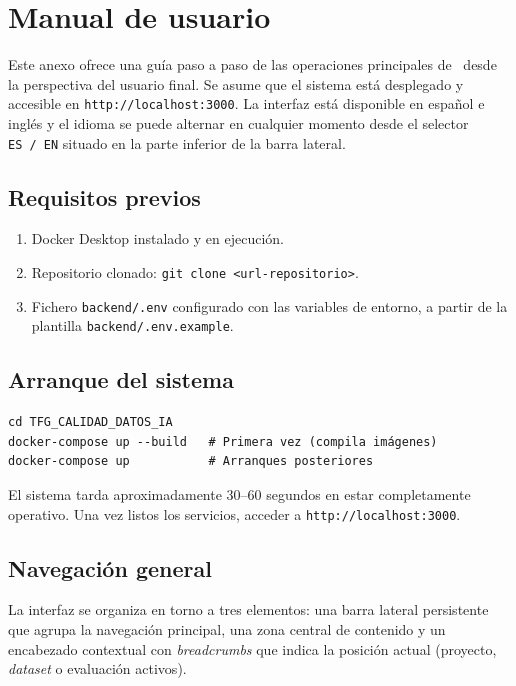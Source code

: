 \chapter{Manual de usuario}
\label{anx:manual}

Este anexo ofrece una guía paso a paso de las operaciones principales
de \dataqual\ desde la perspectiva del usuario final.  Se asume que el
sistema está desplegado y accesible en \texttt{http://localhost:3000}.
La interfaz está disponible en español e inglés y el idioma se puede
alternar en cualquier momento desde el selector \texttt{ES~/~EN}
situado en la parte inferior de la barra lateral.

\section{Requisitos previos}

\begin{enumerate}
  \item Docker Desktop instalado y en ejecución.
  \item Repositorio clonado: \texttt{git clone <url-repositorio>}.
  \item Fichero \texttt{backend/.env} configurado con las variables de
    entorno, a partir de la plantilla
    \texttt{backend/.env.example}.
\end{enumerate}

\section{Arranque del sistema}

\begin{verbatim}
cd TFG_CALIDAD_DATOS_IA
docker-compose up --build   # Primera vez (compila imágenes)
docker-compose up           # Arranques posteriores
\end{verbatim}

El sistema tarda aproximadamente 30--60 segundos en estar completamente
operativo.  Una vez listos los servicios, acceder a
\texttt{http://localhost:3000}.

\section{Navegación general}

La interfaz se organiza en torno a tres elementos: una barra lateral
persistente que agrupa la navegación principal, una zona central de
contenido y un encabezado contextual con \emph{breadcrumbs} que
indica la posición actual (proyecto, \emph{dataset} o evaluación
activos).

